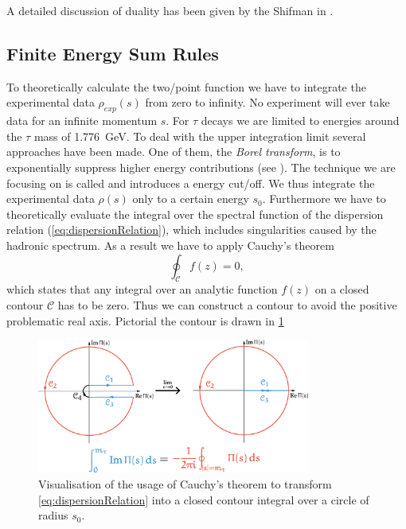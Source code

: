 \documentclass[../../index.tex]{subfiles}
\begin{document}
A detailed discussion of duality has been given by the Shifman in
\cite{Shifman2000}.


\subsection{Finite Energy Sum Rules}
To theoretically calculate the two\-/point function we have to integrate the
experimental data \(\rho_{exp}(s)\) from zero to infinity. No experiment will
ever take data for an infinite momentum \(s\). For \(\tau\) decays we are
limited to energies around the \(\tau\) mass of \SI{1.776}{\giga\eV}. To deal
with the upper integration limit several approaches have been made. One of them,
the \textit{Borel transform}, is to exponentially suppress higher energy
contributions (see \cite{Weinberg1996,Rafael1997}). The technique we are
focusing on is called  and introduces a
energy cut\-/off. We thus integrate the experimental data \(\rho(s)\) only to a
certain energy \(s_0\). Furthermore we have to theoretically evaluate the
integral over the spectral function of the dispersion relation
(\cref{eq:dispersionRelation}), which includes singularities caused by the
hadronic spectrum. As a result we have to apply Cauchy's theorem
\begin{equation}
  \oint_{\mathcal{C}} f(z) = 0,
\end{equation}
which states that any integral over an analytic function \(f(z)\) on a closed
contour \(\mathcal{C}\) has to be zero. Thus we can construct a contour to avoid
the positive problematic real axis. Pictorial the contour is drawn in
\cref{fig:theoreticalTwoPointFunction}
\begin{figure}
  \centering
  \includegraphics[width=0.8\textwidth]{./images/rTauCauchysTheorem.eps}
  \caption{Visualisation of the usage of Cauchy's theorem to transform
    \cref{eq:dispersionRelation} into a closed contour integral over a circle of
    radius \(s_0\).}
  \label{fig:theoreticalTwoPointFunction}
\end{figure}
\end{document}
